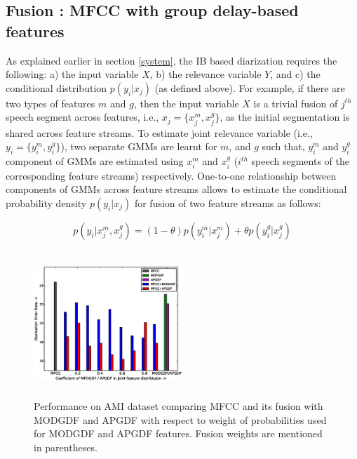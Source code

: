 \documentclass[conference]{IEEEtran}
\begin{document}
\subsection{Fusion : MFCC with group delay-based features}
\label{feature_fusion}

As explained earlier in section \ref{system}, the IB based diarization requires
the following: a) the input variable $X$, b) the relevance variable $Y$, and c)
the conditional distribution $p(y_i|x_j)$ (as defined above). For example, if
there are two types of features $m$ and $g$, then the input variable $X$ is a
trivial 
fusion of $j^{th}$ speech segment across features,
i.e., $x_j = \{x^{m}_j,x^{g}_j\}$, as the initial segmentation is shared across
feature streams. To estimate joint relevance variable (i.e., $y_i = \{
y_i^{m},y_i^{g}\}$), two separate GMMs are learnt for $m$, and $g$ such
that, $y_i^{m}$ and $y_i^{g}$ component of GMMs are estimated using
$x^{m}_i$ and $x^{g}_i$ ($i^{th}$ speech segments of the corresponding
feature streams) respectively. One-to-one relationship between
components of GMMs across feature streams allows to estimate the
conditional probability density $p(y_i|x_j)$ for fusion of two feature
streams as follows:

\begin{equation}
p(y_i|x^{m}_j,x^{g}_j) =  (1-\theta)  p(y_i^{m}|x^{m}_j) +  \theta  p(y_i^{g}|x^{g}_j)
\label{eq:feat_combs}
\end{equation}

\begin{figure}[h]
\centering
\includegraphics[width=0.5\textwidth,height=5.5cm]{figures/newFusionResults.eps}
\caption{Performance on AMI dataset comparing MFCC and its fusion with MODGDF
and APGDF with respect to weight of probabilities used for MODGDF and APGDF
features. Fusion weights are mentioned in parentheses.}
\label{fig:fusionResults}
\end{figure}
\end{document}
